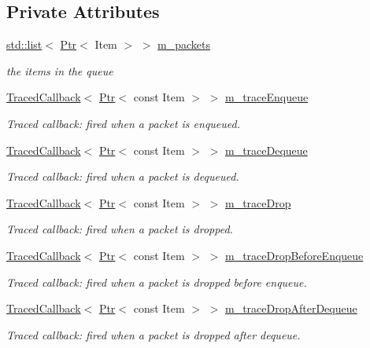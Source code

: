 \subsection*{Private Attributes}
\begin{DoxyCompactItemize}
\item 
\hyperlink{openflow-interface_8h_afd9bcfa176617760671b67580f536fa7}{std\+::list}$<$ \hyperlink{classns3_1_1Ptr}{Ptr}$<$ Item $>$ $>$ \hyperlink{classns3_1_1Queue_a7566add06f61f79cc571ee4822a8bd69}{m\+\_\+packets}
\begin{DoxyCompactList}\small\item\em the items in the queue \end{DoxyCompactList}\item 
\hyperlink{classns3_1_1TracedCallback}{Traced\+Callback}$<$ \hyperlink{classns3_1_1Ptr}{Ptr}$<$ const Item $>$ $>$ \hyperlink{classns3_1_1Queue_a5b68f278485844894ca6395c25d8fefd}{m\+\_\+trace\+Enqueue}
\begin{DoxyCompactList}\small\item\em Traced callback\+: fired when a packet is enqueued. \end{DoxyCompactList}\item 
\hyperlink{classns3_1_1TracedCallback}{Traced\+Callback}$<$ \hyperlink{classns3_1_1Ptr}{Ptr}$<$ const Item $>$ $>$ \hyperlink{classns3_1_1Queue_acba7318200df563f801b26677163df6e}{m\+\_\+trace\+Dequeue}
\begin{DoxyCompactList}\small\item\em Traced callback\+: fired when a packet is dequeued. \end{DoxyCompactList}\item 
\hyperlink{classns3_1_1TracedCallback}{Traced\+Callback}$<$ \hyperlink{classns3_1_1Ptr}{Ptr}$<$ const Item $>$ $>$ \hyperlink{classns3_1_1Queue_adf7eee762113de3df7f4b6a7128b036c}{m\+\_\+trace\+Drop}
\begin{DoxyCompactList}\small\item\em Traced callback\+: fired when a packet is dropped. \end{DoxyCompactList}\item 
\hyperlink{classns3_1_1TracedCallback}{Traced\+Callback}$<$ \hyperlink{classns3_1_1Ptr}{Ptr}$<$ const Item $>$ $>$ \hyperlink{classns3_1_1Queue_a97022bc9ac1f1729b9069c6a9abdabdb}{m\+\_\+trace\+Drop\+Before\+Enqueue}
\begin{DoxyCompactList}\small\item\em Traced callback\+: fired when a packet is dropped before enqueue. \end{DoxyCompactList}\item 
\hyperlink{classns3_1_1TracedCallback}{Traced\+Callback}$<$ \hyperlink{classns3_1_1Ptr}{Ptr}$<$ const Item $>$ $>$ \hyperlink{classns3_1_1Queue_a9182ff9fab4c097f437eba67dc442762}{m\+\_\+trace\+Drop\+After\+Dequeue}
\begin{DoxyCompactList}\small\item\em Traced callback\+: fired when a packet is dropped after dequeue. \end{DoxyCompactList}\end{DoxyCompactItemize}
